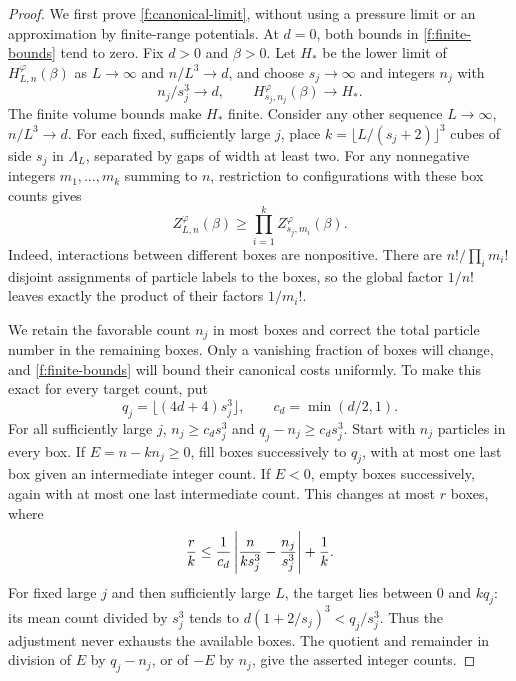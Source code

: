 \begin{proof}
We first prove \eqref{f:canonical-limit}, without using a pressure
limit or an approximation by finite-range potentials.  At $d=0$,
both bounds in \eqref{f:finite-bounds} tend to zero.  Fix $d>0$ and
$\beta>0$.  Let $H_*$ be the lower limit of
$H^\varphi_{L,n}(\beta)$ as $L\to\infty$ and $n/L^3\to d$, and choose
$s_j\to\infty$ and integers $n_j$ with
\[
 n_j/s_j^3\longrightarrow d,\qquad
 H^\varphi_{s_j,n_j}(\beta)\longrightarrow H_*.
\]
The finite volume bounds make $H_*$ finite.  Consider any other
sequence $L\to\infty$, $n/L^3\to d$.  For each fixed, sufficiently
large $j$, place
$k=\lfloor L/(s_j+2)\rfloor^3$ cubes of side $s_j$ in $\Lambda_L$,
separated by gaps of width at least two.  For any nonnegative integers
$m_1,\ldots,m_k$ summing to $n$, restriction to configurations with
these box counts gives
\begin{equation}\label{f:canonical-product}
 Z^\varphi_{L,n}(\beta)
 \ge\prod_{i=1}^k Z^\varphi_{s_j,m_i}(\beta).
\end{equation}
Indeed, interactions between different boxes are nonpositive.  There
are $n!/\prod_i m_i!$ disjoint assignments of particle labels to the
boxes, so the global factor $1/n!$ leaves exactly the product of
their factors $1/m_i!$.

We retain the favorable count $n_j$ in most boxes and correct the
total particle number in the remaining boxes.  Only a vanishing fraction
of boxes will change, and \eqref{f:finite-bounds} will bound their
canonical costs uniformly.  To make this exact for every target count, put
\[
 q_j=\lfloor(4d+4)s_j^3\rfloor,
 \qquad c_d=\min(d/2,1).
\]
For all sufficiently large $j$,
$n_j\ge c_ds_j^3$ and $q_j-n_j\ge c_ds_j^3$.
Start with $n_j$ particles in every box.  If
$E=n-kn_j\ge0$, fill boxes successively to $q_j$, with at most one
last box given an intermediate integer count.  If $E<0$, empty boxes
successively, again with at most one last intermediate count.  This
changes at most $r$ boxes, where
\begin{equation}\label{f:integer-adjustment}
 \frac rk\le\frac1{c_d}
       \left|\frac{n}{ks_j^3}-\frac{n_j}{s_j^3}\right|+\frac1k.
\end{equation}
For fixed large $j$ and then sufficiently large $L$, the target lies
between $0$ and $kq_j$: its mean count divided by $s_j^3$ tends to
$d(1+2/s_j)^3<q_j/s_j^3$.  Thus the adjustment never exhausts the
available boxes.  The quotient and remainder in division of $E$ by
$q_j-n_j$, or of $-E$ by $n_j$, give the asserted integer counts.


\end{proof}
